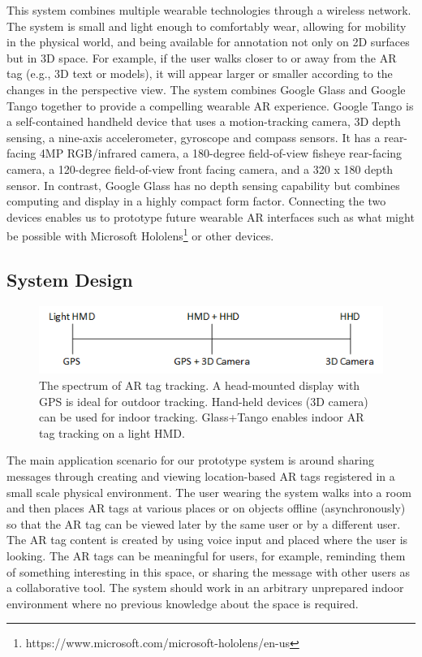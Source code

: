 This system combines multiple wearable technologies through a wireless network. The system is small and light enough to comfortably wear, allowing for mobility in the physical world, and being available for annotation not only on 2D surfaces but in 3D space. For example, if the user walks closer to or away from the AR tag (e.g., 3D text or models), it will appear larger or smaller according to the changes in the perspective view. The system combines Google Glass and Google Tango together to provide a compelling wearable AR experience. Google Tango is a self-contained handheld device that uses a motion-tracking camera, 3D depth sensing, a nine-axis accelerometer, gyroscope and compass sensors. It has a rear-facing 4MP RGB/infrared camera, a 180-degree field-of-view fisheye rear-facing camera, a 120-degree field-of-view front facing camera, and a 320 x 180 depth sensor. In contrast, Google Glass has no depth sensing capability but combines computing and display in a highly compact form factor. Connecting the two devices enables us to prototype future wearable AR interfaces such as what might be possible with Microsoft Hololens\footnote{https://www.microsoft.com/microsoft-hololens/en-us} or other devices.


\subsection{System Design}

\begin{figure}[ht]
  \centering
  \includegraphics[width=.8\linewidth]{images/mgia15/tango_paper_continuum.png}
  \caption{The spectrum of AR tag tracking. A head-mounted display with GPS is ideal for outdoor tracking. Hand-held devices (3D camera) can be used for indoor tracking. Glass+Tango enables indoor AR tag tracking on a light HMD.}
  \label{fig:mgia15:spectrum}
\end{figure}

The main application scenario for our prototype system is around sharing messages through creating and viewing location-based AR tags registered in a small scale physical environment. The user wearing the system walks into a room and then places AR tags at various places or on objects offline (asynchronously) so that the AR tag can be viewed later by the same user or by a different user. The AR tag content is created by using voice input and placed where the user is looking. The AR tags can be meaningful for users, for example, reminding them of something interesting in this space, or sharing the message with other users as a collaborative tool. The system should work in an arbitrary unprepared indoor environment where no previous knowledge about the space is required. 

